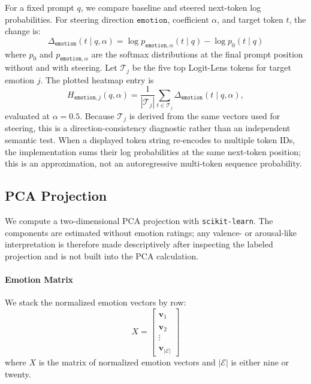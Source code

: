 For a fixed prompt $q$, we compare baseline and steered next-token log probabilities. For steering direction $\mathtt{emotion}$, coefficient
$\alpha$, and target token $t$, the change is:
\begin{equation}
    \Delta_{\mathtt{emotion}}(t\mid q,\alpha)=\log p_{\mathtt{emotion},\alpha}(t\mid q)-\log p_0(t\mid q)
    \label{eqtn:deltalog-prob}
\end{equation}
where $p_0$ and $p_{\mathtt{emotion},\alpha}$ are the softmax distributions at the final prompt position without and with steering. Let $\mathcal{T}_j$ be 
the five top Logit-Lens tokens for target emotion $j$. The plotted heatmap entry is
\begin{equation}
    H_{\mathtt{emotion},j}(q,\alpha)=\frac{1}{|\mathcal{T}_j|}\sum_{t\in\mathcal{T}_j}\Delta_{\mathtt{emotion}}(t\mid q,\alpha),
    \label{eqtn:deltalog-heatmap}
\end{equation}
evaluated at $\alpha=0.5$. Because $\mathcal{T}_j$ is derived from the same vectors used for steering, this is a direction-consistency 
diagnostic rather than an independent semantic test. When a displayed token string re-encodes to multiple token IDs, the implementation 
sums their log probabilities at the same next-token position; this is an approximation, not an autoregressive multi-token sequence probability.

\subsection{PCA Projection}
We compute a two-dimensional PCA projection with \texttt{scikit-learn}. The components are estimated without emotion ratings; any valence- or 
arousal-like interpretation is therefore made descriptively after inspecting the labeled projection and is not built into the PCA calculation.

\paragraph{Emotion Matrix} We stack the normalized emotion vectors by row:
\begin{equation}
    X=
    \begin{bmatrix}
        \mathbf{\hat{v}}_1 \\
        \mathbf{\hat{v}}_2 \\
        \vdots \\
        \mathbf{\hat{v}}_{|\mathcal{E}|}
    \end{bmatrix}
    \label{eqtn:pca-emotionMatrix}
\end{equation}
where $X$ is the matrix of normalized emotion vectors and $|\mathcal{E}|$ is either nine or twenty.

